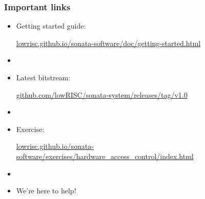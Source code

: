 \begin{frame}
  \frametitle{Important links}

  \begin{itemize}
    \item Getting started guide:

      \url{lowrisc.github.io/sonata-software/doc/getting-started.html}
    \item[]
    \item Latest bitstream:

      \url{github.com/lowRISC/sonata-system/releases/tag/v1.0}
    \item[]
    \item Exercise:

      \url{lowrisc.github.io/sonata-software/exercises/hardware_access_control/index.html}
    \item[]
    \item We're here to help!
  \end{itemize}
\end{frame}


